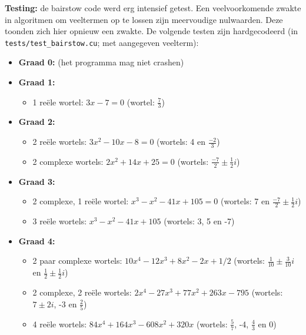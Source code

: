 \documentclass{article}
\begin{document}
\textbf{Testing:} de bairstow code werd erg intensief getest. Een veelvoorkomende zwakte in algoritmen om veeltermen op te lossen zijn meervoudige nulwaarden. Deze toonden zich hier opnieuw een zwakte. De volgende testen zijn hardgecodeerd (in \verb|tests/test_bairstow.cu|; met aangegeven veelterm):
\begin{itemize}
 \item \textbf{Graad 0:} (het programma mag niet crashen)
 \item \textbf{Graad 1:}
 \begin{itemize}
  \item 1 re\"ele wortel: $3x-7 = 0$ (wortel: $\frac{7}{3}$)
 \end{itemize}
 \item \textbf{Graad 2:}
 \begin{itemize}
  \item 2 re\"ele wortels: $3x^2 - 10x - 8 = 0$ (wortels: 4 en $\frac{-2}{3}$)
  \item 2 complexe wortels: $2x^2 + 14x + 25 = 0$ (wortels: $\frac{-7}{2} \pm \frac{1}{2} i$)
 \end{itemize}
 \item \textbf{Graad 3:}
 \begin{itemize}
  \item 2 complexe, 1 re\"ele wortel: $x^3 - x^2 - 41x + 105 = 0$ (wortels: 7 en $\frac{-7}{2} \pm \frac{1}{2} i$)
  \item 3 re\"ele wortels: $x^3 - x^2 - 41x + 105$ (wortels: 3, 5 en -7)
 \end{itemize}
 \item \textbf{Graad 4:}
 \begin{itemize}
  \item 2 paar complexe wortels: $10x^4 - 12x^3 + 8x^2 - 2x + 1/2$ (wortels: $\frac{1}{10} \pm \frac{3}{10} i$ en $\frac{1}{2} \pm \frac{1}{2} i$)
  \item 2 complexe, 2 re\"ele wortels: $2x^4-27x^3+77x^2+263x-795$ (wortels: $7 \pm 2i$, -3 en $\frac{2}{5}$)
  \item 4 re\"ele wortels: $84x^4 + 164x^3 - 608x^2 + 320x$ (wortels: $\frac{5}{7}$, -4, $\frac{4}{3}$ en 0)
 \end{itemize}
\end{itemize}
\end{document}
